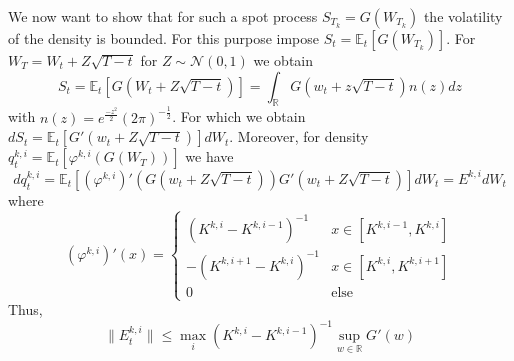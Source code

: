 \documentclass[11pt]{article}
\newcommand{\R}{\mathbb R}
\theoremstyle{plain}
\theoremstyle{definition}
\theoremstyle{remark}
\begin{document}
We now want to show that for such a spot process $S_{T_k} = G(W_{T_k})$ the volatility of the density is bounded. For this purpose impose $S_t = \mathbb{E}_t [G(W_{T_k})] $. For $W_T = W_t + Z \sqrt{T - t}$ for $Z \sim \mathcal{N}(0, 1)$ we obtain 
\begin{equation*}
  S_t = \mathbb{E}_t [ G(W_t + Z \sqrt{T -t}) ] = \int_{\mathbb{R}} G(w_t + z \sqrt{T-t})n(z) dz
\end{equation*} 
with $n(z) = e^{\frac{-z^2}{2}} (2\pi)^{-\frac{1}{2}}$. For which we obtain $dS_t = \mathbb{E}_t[G'(w_t + Z \sqrt{T - t}) ] dW_t $. Moreover, for density $q_t^{k, i} = \mathbb{E}_t[\varphi^{k,i}(G(W_T))]$ we have 
\begin{equation}
d q_t^{k, i} = \mathbb{E}_t [(\varphi^{k,i})'(G(w_t + Z \sqrt{T-t})) G'(w_t + Z \sqrt{T-t})] dW_t = E^{k, i} dW_t
\end{equation}
where 
\begin{equation}
(\varphi^{k,i})'(x) = 
\begin{cases}
  (K^{k, i} - K^{k, i-1})^{-1} & x \in [K^{k, i-1}, K^{k, i}]\\
  -  (K^{k, i+1} - K^{k, i})^{-1}  & x \in [K^{k, i}, K^{k, i+1}] \\ 
  0 & \textrm{else} 
\end{cases}
\end{equation}
Thus, 
\begin{equation}
  \| E_t^{k, i} \| \leq \max_{i} (K^{k, i} - K^{k, i-1})^{-1}  \sup_{w \in \R} G'(w)  
\end{equation}
\end{document}

